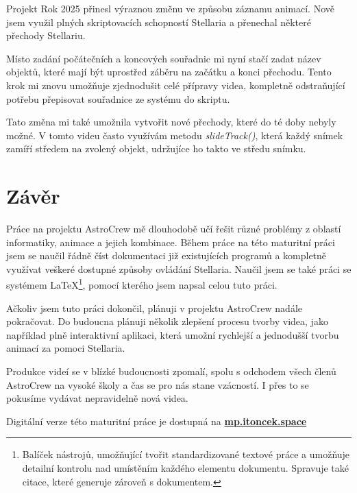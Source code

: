 \documentclass[12pt,a4paper,titlepage]{article}
\newcommand{\link}[2]{\href{#1}{\textcolor{link-color}{\textbf{#2}}}}%
\begin{document}
Projekt Rok 2025 přinesl výraznou změnu ve způsobu záznamu animací. Nově jsem využil plných skriptovacích schopností Stellaria a přenechal některé přechody Stellariu. 

Místo zadání počátečních a koncových souřadnic mi nyní stačí zadat název objektů, které mají být uprostřed záběru na začátku a konci přechodu. Tento krok mi znovu umožňuje zjednodušit celé přípravy videa, kompletně odstraňující potřebu přepisovat souřadnice ze systému do skriptu. 

Tato změna mi také umožnila vytvořit nové přechody, které do té doby nebyly možné. V tomto videu často využívám metodu \textit{slideTrack()}, která každý snímek zamíří středem na zvolený objekt, udržujíce ho takto ve středu snímku. %

\section{Závěr}
Práce na projektu AstroCrew mě dlouhodobě učí řešit různé problémy z oblastí informatiky, animace a jejich kombinace. Během práce na této maturitní práci jsem se naučil řádně číst dokumentaci již existujících programů a kompletně využívat veškeré dostupné způsoby ovládání Stellaria. Naučil jsem se také práci se systémem \LaTeX{}\footnote{Balíček nástrojů, umožňující tvořit standardizované textové práce a umožňuje detailní kontrolu nad umístěním každého elementu dokumentu. Spravuje také citace, které generuje zároveň s dokumentem.}, pomocí kterého jsem napsal celou tuto práci.

Ačkoliv jsem tuto práci dokončil, plánuji v projektu AstroCrew nadále pokračovat. Do budoucna plánuji několik zlepšení procesu tvorby videa, jako například plně interaktivní aplikaci, která umožní rychlejší a jednodušší tvorbu animací za pomoci Stellaria. 

Produkce videí se v blízké budoucnosti zpomalí, spolu s odchodem všech členů AstroCrew na vysoké školy a čas se pro nás stane vzácností. I přes to se pokusíme vydávat nepravidelně nová videa.

Digitální verze této maturitní práce je dostupná na \link{https://mp.itoncek.space}{mp.itoncek.space}
\end{document}
